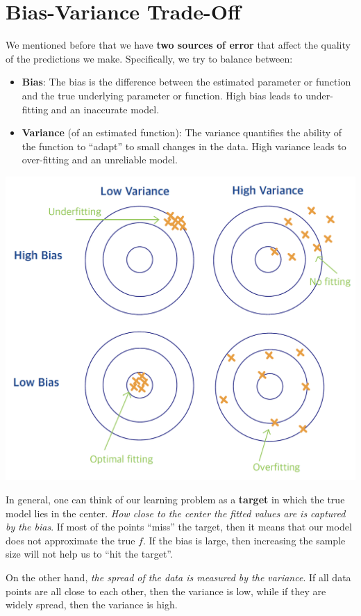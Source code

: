 \documentclass[
]{book}
\begin{document}
\section{Bias-Variance Trade-Off}\label{bias-variance-trade-off}

We mentioned before that we have \textbf{two sources of error} that affect the quality of the predictions we make. Specifically, we try to balance between:

\begin{itemize}
\item
  \textbf{Bias}: The bias is the difference between the estimated parameter or function and the true underlying parameter or function. High bias leads to under-fitting and an inaccurate model.
\item
  \textbf{Variance} (of an estimated function): The variance quantifies the ability of the function to ``adapt'' to small changes in the data. High variance leads to over-fitting and an unreliable model.
\end{itemize}

\begin{center}\includegraphics[width=0.6\linewidth]{images/week1/tradeoff1} \end{center}

In general, one can think of our learning problem as a \textbf{target} in which the true model lies in the center. \emph{How close to the center the fitted values are is captured by the bias}. If most of the points ``miss'' the target, then it means that our model does not approximate the true \(f\). If the bias is large, then increasing the sample size will not help us to ``hit the target''.

On the other hand, \emph{the spread of the data is measured by the variance}. If all data points are all close to each other, then the variance is low, while if they are widely spread, then the variance is high.
\end{document}
